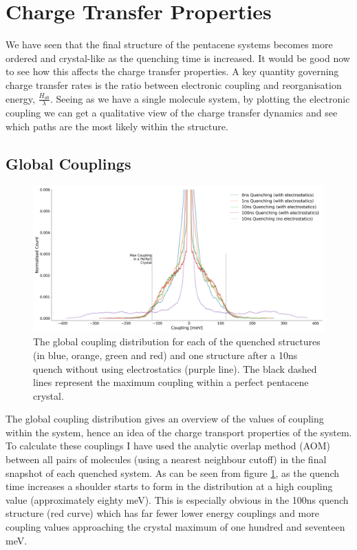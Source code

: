 \section{Charge Transfer Properties}
We have seen that the final structure of the pentacene systems becomes more ordered and crystal-like as the quenching time is increased. It would be good now to see how this affects the charge transfer properties. A key quantity governing charge transfer rates is the ratio between electronic coupling and reorganisation energy, $\frac{H_{ab}}{\lambda}$. Seeing as we have a single molecule system, by plotting the electronic coupling we can get a qualitative view of the charge transfer dynamics and see which paths are the most likely within the structure.
\subsection{Global Couplings}
\label{sect:GlobCoup}
\begin{figure}[ht]
	\includegraphics[width=\textwidth]{../img/DifferentQuenchTimes/GlobalCouplings.png}
	\caption{\label{fig:glob_coup}The global coupling distribution for each of the quenched structures (in blue, orange, green and red) and one structure after a 10ns quench without using electrostatics (purple line). The black dashed lines represent the maximum coupling within a perfect pentacene crystal.}
\end{figure}
\noindent The global coupling distribution gives an overview of the values of coupling within the system, hence an idea of the charge transport properties of the system. To calculate these couplings I have used the analytic overlap method (AOM)\cite{gajdos_ultrafast_2014} between all pairs of molecules (using a nearest neighbour cutoff) in the final snapshot of each quenched system. As can be seen from figure \ref{fig:glob_coup}, as the quench time increases a shoulder starts to form in the distribution at a high coupling value (approximately eighty meV). This is especially obvious in the 100ns quench structure (red curve) which has far fewer lower energy couplings and more coupling values approaching the crystal maximum of one hundred and seventeen meV.
